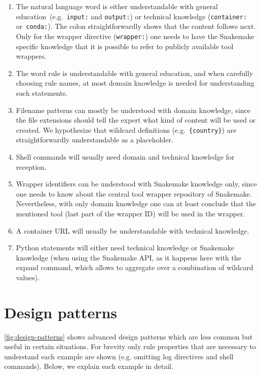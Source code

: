 \documentclass{scrartcl}
\begin{document}
\begin{enumerate}
	\item The natural language word is either understandable with general education~(e.g.\ \lstinline!input:! and \lstinline!output:!) or technical knowledge (\lstinline!container:! or~\lstinline!conda:!).
	      The colon straightforwardly shows that the content follows next.
	      Only for the wrapper directive (\lstinline!wrapper:!) one needs to have the Snakemake specific knowledge that it is possible to refer to publicly available tool wrappers.
	\item
	      The word rule is understandable with general education, and when
	      carefully choosing rule names, at most domain knowledge is needed for
	      understanding such statements.
	\item
	      Filename patterns can mostly be understood with domain knowledge,
	      since the file extensions should tell the expert what kind of content
	      will be used or created.
	      We hypothesize that wildcard definitions (e.g.~\lstinline!{country}!) are straightforwardly understandable as a placeholder.
	\item
	      Shell commands will usually need domain and technical knowledge for
	      reception.
	\item
	      Wrapper identifiers can be understood with Snakemake knowledge only,
	      since one needs to know about the central tool wrapper repository of
	      Snakemake.
	      Nevertheless, with only domain knowledge one can at least conclude that the mentioned tool (last part of the wrapper ID) will be used in the wrapper.
	\item
	      A container URL will usually be understandable with technical
	      knowledge.
	\item
	      Python statements will either need technical knowledge or Snakemake
	      knowledge (when using the Snakemake API, as it happens here with the
	      expand command, which allows to aggregate over a combination of
	      wildcard values).
\end{enumerate}

\section{Design patterns}\label{sec:design-patterns}

\autoref{fig:design-patterns} shows advanced design patterns which are less common but useful in certain situations.
For brevity only rule properties that are necessary to understand each example are shown (e.g. omitting log directives and shell commands).
Below, we explain each example in detail.
\end{document}
